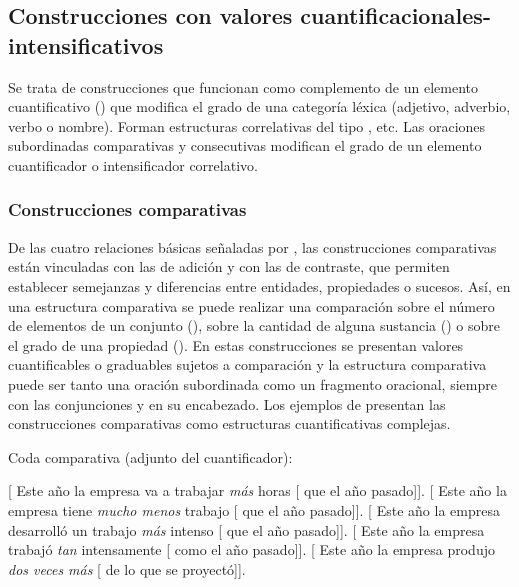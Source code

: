 \subsection{Construcciones con valores cuantificacionales-intensificativos}\label{sec:13-cuantificativas}

Se trata de construcciones que funcionan como complemento de un elemento
cuantificativo () que modifica el grado de una categoría
léxica (adjetivo, adverbio, verbo o nombre). Forman estructuras correlativas del
tipo , etc. Las
oraciones subordinadas comparativas y consecutivas modifican el grado de un
elemento cuantificador o intensificador correlativo.

\subsubsection{Construcciones comparativas}\label{sec:13-comparativas}

De las cuatro relaciones básicas señaladas por \textcite{rudolph1996}, las
construcciones comparativas están vinculadas con las de adición y con las de
contraste, que permiten establecer semejanzas y diferencias entre entidades,
propiedades o sucesos. Así, en una estructura comparativa se puede realizar una
comparación sobre el número de elementos de un conjunto (),
sobre la cantidad de alguna sustancia () o sobre el grado de una propiedad (). En estas construcciones
se presentan valores cuantificables o graduables sujetos a comparación y la
estructura comparativa puede ser tanto una oración subordinada como un fragmento
oracional, siempre con las conjunciones  y  en su
encabezado. Los ejemplos de  presentan las construcciones
comparativas como estructuras cuantificativas complejas.

\begin{exe}
  \ex\label{ex:13-compar} Coda comparativa (adjunto del cuantificador):
    \begin{xlist}
      \ex\label{ex:13-compar-a} {}[ Este año la empresa va a trabajar
          \textit{más} horas [ que el año pasado]].
      \ex\label{ex:13-compar-b} {}[ Este año la empresa tiene \textit{mucho
          menos} trabajo [ que el año pasado]].
      \ex\label{ex:13-compar-c} {}[ Este año la empresa desarrolló un
          trabajo \textit{más} intenso [ que el año pasado]].
      \ex\label{ex:13-compar-d} {}[ Este año la empresa trabajó
          \textit{tan} intensamente [ como el año pasado]].
      \ex\label{ex:13-compar-e} {}[ Este año la empresa produjo \textit{dos
          veces más} [ de lo que se proyectó]].
    \end{xlist}
\end{exe}

